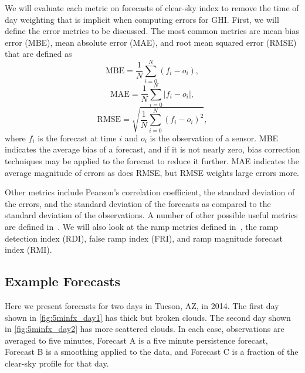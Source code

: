 We will evaluate each metric on forecasts of clear-sky index to remove
the time of day weighting that is implicit when computing errors for
GHI.
First, we will define the error metrics to be discussed.
The most common metrics are mean bias error (MBE), mean absolute error
(MAE), and root mean squared error (RMSE) that are defined as
\begin{equation}
\mbox{MBE} = \frac{1}{N} \sum_{i=0}^N (f_i - o_i),
\end{equation}
\begin{equation}
\mbox{MAE} = \frac{1}{N} \sum_{i=0}^N |f_i - o_i|,
\end{equation}
\begin{equation}
\mbox{RMSE} = \sqrt{\frac{1}{N} \sum_{i=0}^N (f_i - o_i)^2},
\end{equation}
where $f_i$ is the forecast at time $i$ and $o_i$ is the observation
of a sensor.
MBE indicates the average bias of a forecast, and if it is not nearly
zero, bias correction techniques may be applied to the forecast to
reduce it further.
MAE indicates the average magnitude of errors as does RMSE, but RMSE
weights large errors more.

Other metrics include Pearson's correlation coefficient, the standard
deviation of the errors, and the standard deviation of the forecasts
as compared to the standard deviation of the observations.
A number of other possible useful metrics are defined
in~\cite{Zhang2015}.
We will also look at the ramp metrics defined in~\cite{Chu2015b}, the
ramp detection index (RDI), false ramp index (FRI), and ramp
magnitude forecast index (RMI).

\subsection{Example Forecasts}
Here we present forecasts for two days in Tucson, AZ, in 2014.
The first day shown in \cref{fig:5minfx_day1} has thick but broken
clouds.
The second day shown in \cref{fig:5minfx_day2} has more scattered
clouds.
In each case, observations are averaged to five minutes, Forecast A is
a five minute persistence forecast, Forecast B is a smoothing applied
to the data, and Forecast C is a fraction of the clear-sky profile for
that day.

